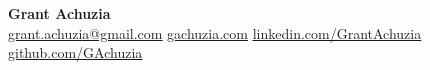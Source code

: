 \begin{center}
    \textbf{\Huge Grant Achuzia} \\ \vspace{1pt}
    \href{mailto:grant.achuzia@gmail.com}{ \underline{grant.achuzia@gmail.com}} \quad
    \href{https://gachuzia.com/}{ \underline{gachuzia.com}} \quad
    \href{https://www.linkedin.com/in/grant-achuzia-8259251b8/}{ \underline{linkedin.com/GrantAchuzia}} \quad
    \href{https://github.com/GAchuzia}{ \underline{github.com/GAchuzia}} \quad
    
\end{center}